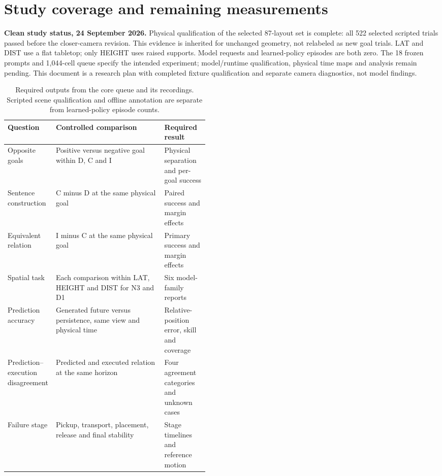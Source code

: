 \section{Study coverage and remaining measurements}
\label{sec:coverage-update}
\textbf{Clean study status, 24 September 2026.}
Physical qualification of the selected 87-layout set is complete: all 522 selected scripted trials passed before the closer-camera revision. This evidence is inherited for unchanged geometry, not relabeled as new goal trials. LAT and DIST use a flat tabletop; only HEIGHT uses raised supports. Model requests and learned-policy episodes are both zero. The 18 frozen prompts and 1,044-cell queue specify the intended experiment; model/runtime qualification, physical time maps and analysis remain pending. This document is a research plan with completed fixture qualification and separate camera diagnostics, not model findings.

\begin{table}[ht]
\centering\small
\begin{tabularx}{\linewidth}{@{}>{\raggedright\arraybackslash}p{0.24\linewidth}>{\raggedright\arraybackslash}X>{\raggedright\arraybackslash}p{0.22\linewidth}@{}}
\toprule
Question & Controlled comparison & Required result \\
\midrule
Opposite goals & Positive versus negative goal within D, C and I & Physical separation and per-goal success \\
Sentence construction & C minus D at the same physical goal & Paired success and margin effects \\
Equivalent relation & I minus C at the same physical goal & Primary success and margin effects \\
Spatial task & Each comparison within LAT, HEIGHT and DIST for N3 and D1 & Six model-family reports \\
Prediction accuracy & Generated future versus persistence, same view and physical time & Relative-position error, skill and coverage \\
Prediction--execution disagreement & Predicted and executed relation at the same horizon & Four agreement categories and unknown cases \\
Failure stage & Pickup, transport, placement, release and final stability & Stage timelines and reference motion \\
\bottomrule
\end{tabularx}
\caption{Required outputs from the core queue and its recordings. Scripted scene qualification and offline annotation are separate from learned-policy episode counts.}
\end{table}

